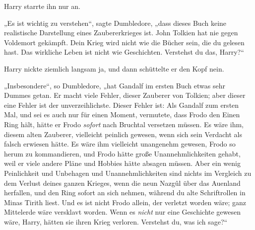 Harry starrte ihn nur an.

„Es ist wichtig zu verstehen“, sagte Dumbledore, „dass dieses Buch keine realistische Darstellung eines Zaubererkrieges ist. John Tolkien hat nie gegen Voldemort gekämpft. Dein Krieg wird nicht wie die Bücher sein, die du gelesen hast. Das wirkliche Leben ist nicht wie Geschichten. Verstehst du das, Harry?“

Harry nickte ziemlich langsam ja, und dann schüttelte er den Kopf nein.

„Insbesondere“, so Dumbledore, „hat Gandalf im ersten Buch etwas sehr Dummes getan. Er macht viele Fehler, dieser Zauberer von Tolkien; aber dieser eine Fehler ist der unverzeihlichste. Dieser Fehler ist: Als Gandalf zum ersten Mal, und sei es auch nur für einen Moment, vermutete, dass Frodo den Einen Ring hält, hätte er Frodo \emph{sofort} nach Bruchtal versetzen müssen. Es wäre ihm, diesem alten Zauberer, vielleicht peinlich gewesen, wenn sich sein Verdacht als falsch erwiesen hätte. Es wäre ihm vielleicht unangenehm gewesen, Frodo so herum zu kommandieren, und Frodo hätte große Unannehmlichkeiten gehabt, weil er viele andere Pläne und Hobbies hätte absagen müssen. Aber ein wenig Peinlichkeit und Unbehagen und Unannehmlichkeiten sind nichts im Vergleich zu dem Verlust deines ganzen Krieges, wenn die neun Nazgûl über das Auenland herfallen, und den Ring sofort an sich nehmen, während du alte Schriftrollen in Minas Tirith liest. Und es ist nicht Frodo allein, der verletzt worden wäre; ganz Mittelerde wäre versklavt worden. Wenn es \emph{nicht} nur eine Geschichte gewesen wäre, Harry, hätten sie ihren Krieg verloren. Verstehst du, was ich sage?“


